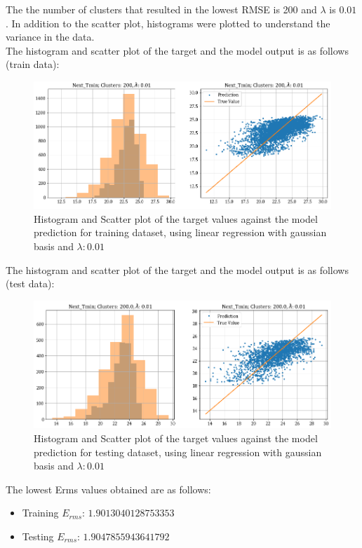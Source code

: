 \documentclass[12pt,a4paper]{article}
\newcommand{\noi}{\noindent}
\begin{document}
\noi
The the number of clusters that resulted in the lowest RMSE is 200 and $\lambda$ is $0.01$. In addition to the scatter plot, histograms were plotted to understand the variance in the data.\\

\noi
The histogram and scatter plot of the target and the model output is as follows (train data):
\begin{figure}[H]
     \centering
     \includegraphics[scale=0.49]{images/t3_d3/reg/T_min_nclu_200_lambda_0.01.png}
     \caption{Histogram and Scatter plot of the target values against the model prediction for training dataset, using linear regression with gaussian basis and $\lambda: 0.01$}
\end{figure}

\noi
The histogram and scatter plot of the target and the model output is as follows (test data):
\begin{figure}[H]
    \centering
    \includegraphics[scale=0.49]{images/t3_d3/reg/tmin_test.png}
    \caption{Histogram and Scatter plot of the target values against the model prediction for testing dataset, using linear regression with gaussian basis and $\lambda: 0.01$}
\end{figure}

\noi
The lowest Erms values obtained are as follows:
\begin{itemize}
    \itemsep0em
    \item Training $E_{rms}$: $1.9013040128753353$
    \item Testing $E_{rms}$: $1.9047855943641792$
\end{itemize}
\end{document}
